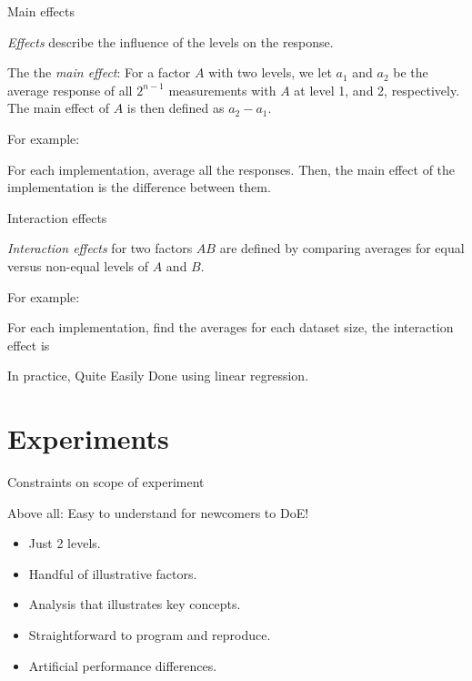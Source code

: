 \documentclass[english,handout,aspectratio=169]{ifislide}
\begin{document}
\begin{frame}{Main effects}

\emph{Effects} describe the influence of the levels on the response.

The the \emph{main effect}: For a factor $A$ with two levels, we let
$a_1$ and $a_2$ be the average response of all $2^{n-1}$ measurements
with $A$ at level 1, and 2, respectively.  The main effect of $A$ is
then defined as $a_2 - a_1$.

For example: 

For each implementation, average all the responses. Then, the main
effect of the implementation is the difference between them.

\end{frame}

\begin{frame}{Interaction effects}

\emph{Interaction effects} for two factors $AB$ are defined
by comparing averages for equal versus non-equal levels of $A$ and
$B$. 

For example:

For each implementation, find the averages for each dataset size, the
interaction effect is %


In practice, Quite Easily Done using linear regression.
\end{frame}



\section{Experiments}

\begin{frame}{Constraints on scope of experiment}

Above all: Easy to understand for newcomers to DoE!

\begin{itemize}
\item Just 2 levels.
\item Handful of illustrative factors.
\item Analysis that illustrates key concepts.
\item Straightforward to program and reproduce.
\item Artificial performance differences.
\end{itemize}

\end{frame}
\end{document}
